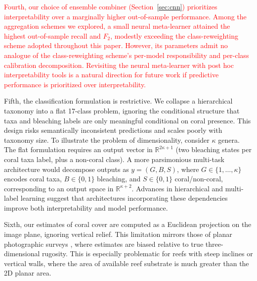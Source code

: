 \documentclass[11pt]{elsarticle}
\newcommand{\revadd}[1]{\textcolor{red}{#1}}
\begin{document}
\revadd{Fourth, our choice of ensemble combiner (Section~\ref{sec:cnn}) prioritizes interpretability over a marginally higher out-of-sample performance. Among the aggregation schemes we explored, a small neural meta-learner attained the highest out-of-sample recall and $F_2$, modestly exceeding the class-reweighting scheme adopted throughout this paper. However, its parameters admit no analogue of the class-reweighting scheme's per-model responsibility and per-class calibration decomposition. Revisiting the neural meta-learner with post hoc interpretability tools is a natural direction for future work if predictive performance is prioritized over interpretability.}

Fifth, the classification formulation is restrictive. We collapse a hierarchical taxonomy into a flat 17-class problem, ignoring the conditional structure that taxa and bleaching labels are only meaningful conditional on coral presence. This design risks semantically inconsistent predictions and scales poorly with taxonomy size. To illustrate the problem of dimensionality, consider $\kappa$ genera. The flat formulation requires an output vector in $\mathbb{R}^{2\kappa+1}$ (two bleaching states per coral taxa label, plus a non-coral class). A more parsimonious multi-task architecture would decompose outputs as $y = (G,B,S)$, where $G \in \{1,\ldots,\kappa\}$ encodes coral taxa, $B \in \{0,1\}$ bleaching, and $S \in \{0,1\}$ coral/non-coral, corresponding to an output space in $\mathbb{R}^{\kappa+2}$.%
Advances in hierarchical and multi-label learning \citep{wehrmann2018hierarchical, deng2014large, wang2016cnn, nam2014large} suggest that architectures incorporating these dependencies improve both interpretability and model performance.

Sixth, our estimates of coral cover are computed as a Euclidean projection on the image plane, ignoring vertical relief. This limitation mirrors those of planar photographic surveys \citep{peerj954}, where estimates are biased relative to true three-dimensional rugosity. This is especially problematic for reefs with steep inclines or vertical walls, where the area of available reef substrate is much greater than the 2D planar area.  %
\end{document}
